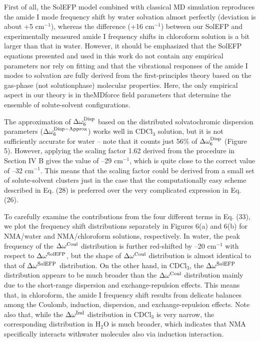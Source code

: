 \documentclass[a4paper,titlepage,twoside,fleqn,12pt]{book}
\begin{document}
\begin{refsection}
First of all, the SolEFP model combined with classical
MD simulation reproduces the amide I mode frequency
shift by water solvation almost perfectly (deviation is about
+5 cm$^{-1}$), whereas the difference (+16 cm$^{-1}$) between our
SolEFP and experimentally measured amide I frequency shifts
in chloroform solution is a bit larger than that in water.
However, it should be emphasized that the SolEFP equations
presented and used in this work do not contain any empirical
parameters nor rely on fitting and that the vibrational responses
of the amide I modes to solvation are fully derived from the
first\hyp{}principles theory based on the gas\hyp{}phase (not solutionphase)
molecular properties. Here, the only empirical aspect
in our theory is in theMDforce field parameters that determine
the ensemble of solute\hyp{}solvent configurations.

The approximation of $\Delta\omega^{\rm Disp}_6$
based on the distributed
solvatochromic dispersion parameters ($\Delta\omega^{\rm Disp-Approx}_6$)
works
well in CDCl$_3$ solution, but it is not sufficiently accurate for
water -- note that it counts just 56\% of $\Delta\omega^{\rm Disp}_6$
(Figure 5).
However, applying the scaling factor 1.62 derived from the
procedure in Section IV B gives the value of --29 cm$^{-1}$, which
is quite close to the correct value of --32 cm$^{-1}$. This means
that the scaling factor could be derived from a small set of
solute\hyp{}solvent clusters just in the case that the computationally
easy scheme described in Eq. (28) is preferred over the very
complicated expression in Eq. (26).

To carefully examine the contributions from the four
different terms in Eq. (33), we plot the frequency shift distributions
separately in Figures 6(a) and 6(b) for NMA/water and
NMA/chloroform solutions, respectively. In water, the peak
frequency of the $\Delta\omega^{\rm Coul}$ distribution is further red\hyp{}shifted by
--20 cm$^{-1}$ with respect to $\Delta\omega^{\rm SolEFP}$, but the shape of $\Delta\omega^{\rm Coul}$
distribution is almost identical to that of $\Delta\omega^{\rm SolEFP}$ distribution.
On the other hand, in CDCl$_3$, the $\Delta\omega^{\rm SolEFP}$ distribution appears
to be much broader than the $\Delta\omega^{\rm Coul}$ distribution mainly due
to the short\hyp{}range dispersion and exchange\hyp{}repulsion effects.
This means that, in chloroform, the amide I frequency shift
results from delicate balances among the Coulomb, induction,
dispersion, and exchange\hyp{}repulsion effects. Note also that,
while the $\Delta\omega^{\rm Ind}$ distribution in CDCl$_3$ is very narrow, the
corresponding distribution in H$_2$O is much broader, which
indicates that NMA specifically interacts withwater molecules
also via induction interaction.




\end{refsection}
\end{document}
